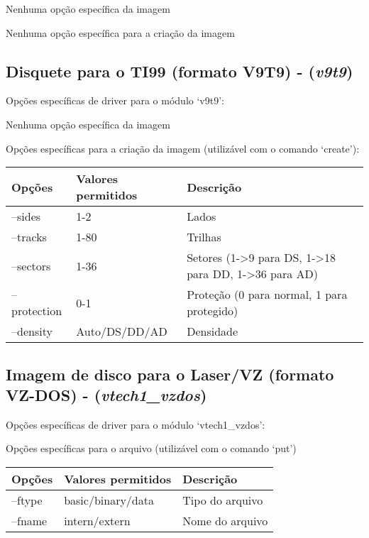 \documentclass[letterpaper,10pt,brazil]{sphinxmanual}
\begin{document}
Nenhuma opção específica da imagem

Nenhuma opção específica para a criação da imagem


\subsection{Disquete para o TI99 (formato V9T9) - (\emph{v9t9})}
\label{tools/imgtool:disquete-para-o-ti99-formato-v9t9-v9t9}
Opções específicas de driver para o módulo `v9t9':

Nenhuma opção específica da imagem

Opções específicas para a criação da imagem (utilizável com o comando `create'):

\noindent\begin{tabulary}{\linewidth}{|L|L|L|}
\hline

Opções
&
Valores permitidos
&
Descrição
\\
\hline
--sides
&
1-2
&
Lados
\\
\hline
--tracks
&
1-80
&
Trilhas
\\
\hline
--sectors
&
1-36
&
Setores (1-\textgreater{}9 para DS, 1-\textgreater{}18 para DD, 1-\textgreater{}36 para AD)
\\
\hline
--protection
&
0-1
&
Proteção (0 para normal, 1 para protegido)
\\
\hline
--density
&
Auto/DS/DD/AD
&
Densidade
\\
\hline\end{tabulary}



\subsection{Imagem de disco para o Laser/VZ (formato VZ-DOS) - (\emph{vtech1\_vzdos})}
\label{tools/imgtool:imagem-de-disco-para-o-laser-vz-formato-vz-dos-vtech1-vzdos}
Opções específicas de driver para o módulo `vtech1\_vzdos':

Opções específicas para o arquivo (utilizável com o comando `put')

\noindent\begin{tabulary}{\linewidth}{|L|L|L|}
\hline

Opções
&
Valores permitidos
&
Descrição
\\
\hline
--ftype
&
basic/binary/data
&
Tipo do arquivo
\\
\hline
--fname
&
intern/extern
&
Nome do arquivo
\\
\hline\end{tabulary}
\end{document}
